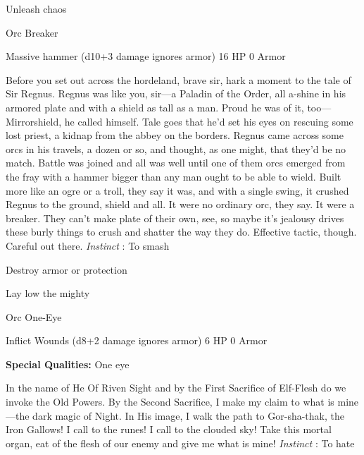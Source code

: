  
\item Unleash chaos


\stopitemize
 
\startMonsterName
Orc Breaker	 
\stopMonsterName
 

Massive hammer (d10+3 damage ignores armor)	16 HP	0 Armor

 


 
\startMonsterDescription
Before you set out across the hordeland, brave sir, hark a moment to the tale of Sir Regnus. Regnus was like you, sir—a Paladin of the Order, all a-shine in his armored plate and with a shield as tall as a man. Proud he was of it, too—Mirrorshield, he called himself. Tale goes that he’d set his eyes on rescuing some lost priest, a kidnap from the abbey on the borders. Regnus came across some orcs in his travels, a dozen or so, and thought, as one might, that they’d be no match. Battle was joined and all was well until one of them orcs emerged from the fray with a hammer bigger than any man ought to be able to wield. Built more like an ogre or a troll, they say it was, and with a single swing, it crushed Regnus to the ground, shield and all. It were no ordinary orc, they say. It were a breaker. They can’t make plate of their own, see, so maybe it’s jealousy drives these burly things to crush and shatter the way they do. Effective tactic, though. Careful out there. {\em Instinct} : To smash
\stopMonsterDescription
 
\startitemize[1,packed]

\item Destroy armor or protection

 
\item Lay low the mighty


\stopitemize
 
\startMonsterName
Orc One-Eye	 
\stopMonsterName
 

Inflict Wounds (d8+2 damage ignores armor)	6 HP	0 Armor

 


 
\startMonsterQualities
{\bf Special Qualities:}  One eye
\stopMonsterQualities
 
\startMonsterDescription
In the name of He Of Riven Sight and by the First Sacrifice of Elf-Flesh do we invoke the Old Powers. By the Second Sacrifice, I make my claim to what is mine—the dark magic of Night. In His image, I walk the path to Gor-sha-thak, the Iron Gallows! I call to the runes! I call to the clouded sky! Take this mortal organ, eat of the flesh of our enemy and give me what is mine! {\em Instinct} : To hate
\stopMonsterDescription
 
